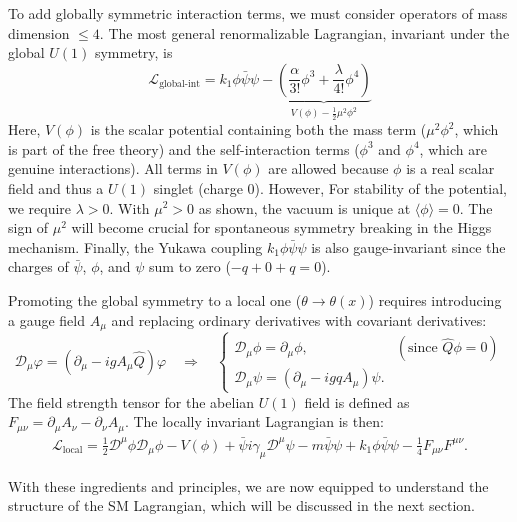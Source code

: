 To add globally symmetric interaction terms, we must consider operators of mass dimension $\leq 4$. The most general renormalizable Lagrangian, invariant under the global $U(1)$ symmetry, is
\begin{equation}
	\mathcal L_{\text{global-int}} = k_1 \phi\bar\psi\psi - \underbrace{ \left(\frac{\alpha}{3!}\phi^3+\frac{\lambda}{4!}\phi^4\right)}_{V(\phi)-\frac{1}{2}\mu^2\phi^2}
\end{equation}
Here, $V(\phi)$ is the scalar potential containing both the mass term ($\mu^2\phi^2$, which is part of the free theory) and the self-interaction terms ($\phi^3$ and $\phi^4$, which are genuine interactions). All terms in $V(\phi)$ are allowed because $\phi$ is a real scalar field and thus a $U(1)$ singlet (charge 0). However,  For stability of the potential, we require $\lambda > 0$. With $\mu^2 > 0$ as shown, the vacuum is unique at $\langle\phi\rangle = 0$. The sign of $\mu^2$ will become crucial for spontaneous symmetry breaking in the Higgs mechanism. Finally, the Yukawa coupling $k_1 \phi\bar\psi\psi$ is also gauge-invariant since the charges of $\bar\psi$, $\phi$, and $\psi$ sum to zero ($-q + 0 + q = 0$).

Promoting the global symmetry to a local one ($\theta \to \theta(x)$) requires introducing a gauge field $A_\mu$ and replacing ordinary derivatives with covariant derivatives:
\begin{equation}
	\mathcal D_\mu\varphi=(\partial_{\mu}-i g A_\mu\hat Q )\varphi
	\quad\Longrightarrow\quad
	\begin{cases}
		\mathcal D_\mu\phi=\partial_\mu \phi, & (\text{since } \hat Q\phi=0)\\
		\mathcal D_\mu\psi=(\partial_\mu - i g q A_\mu) \psi.
	\end{cases}
\end{equation}
The field strength tensor for the abelian $U(1)$ field is defined as $F_{\mu\nu} = \partial_\mu A_\nu - \partial_\nu A_\mu$. The locally invariant Lagrangian is then:
\begin{multline}
	\mathcal L_{\text{local}}=\frac{1}{2} \mathcal D^{\mu} \phi \mathcal D_{\mu} \phi-V(\phi)
	+\bar{\psi}i \gamma_\mu  \mathcal D^{\mu} \psi - m \bar{\psi}\psi
	+ k_1 \phi\bar\psi\psi-\frac{1}{4} F_{\mu\nu}F^{\mu\nu}.
\end{multline}


With these ingredients and principles, we are now equipped to understand the structure of the SM Lagrangian, which will be discussed in the next section.

